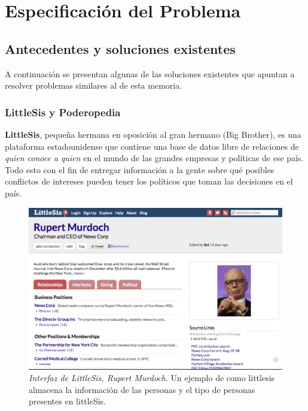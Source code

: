 \chapter{Especificación del Problema}
\label{chap:especificacion_problema}

\section{Antecedentes y soluciones existentes} %
\label{sec:antecedentes_y_soluciones_existentes}

A continuación se presentan algunas de las soluciones existentes que apuntan a resolver problemas similares al de esta memoria.

\subsection{LittleSis y Poderopedia} %
\label{sub:littlesis_y_poderopedia}

\textbf{LittleSis}, pequeña hermana en oposición al gran hermano (Big Brother), es una plataforma estadounidense que contiene una base de datos libre de relaciones de \emph{quien conoce a quien} en el mundo de las grandes empresas y políticas de ese país. Todo esto con el fin de entregar información a la gente sobre qué posibles conflictos de intereses pueden tener los políticos que toman las decisiones en el país.

\begin{figure}[H]
  \includegraphics[width=1.0\textwidth]{images/littlesis.png}
  \caption[Interfaz de LittleSis, Rupert Murdoch]{\emph{Interfaz de LittleSis, Rupert Murdoch}. Un ejemplo de como littlesis almacena la información de las personas y el tipo de personas presentes en littleSis.}
  \label{ejemplo_littlesis}
\end{figure}

